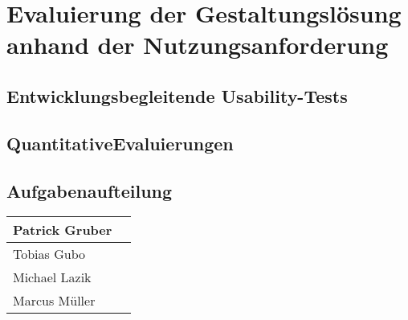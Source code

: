 \documentclass[12pt, a4paper]{scrartcl}
\begin{document}
	\newpage
	
	\section{Evaluierung der Gestaltungslösung anhand der Nutzungsanforderung}
	\blindtext[2]
	\subsection{Entwicklungsbegleitende Usability-Tests}
	\blindtext[1]
	\subsection{QuantitativeEvaluierungen}
	\blindtext[1]
	
	\subsection*{Aufgabenaufteilung}
	\begin{tabularx}{0.95\textwidth}{|l|X|}
		\hline
		Patrick Gruber & \\
		\hline
		Tobias Gubo & \\
		\hline
		Michael Lazik & \\
		\hline
		Marcus Müller & \\
		\hline
	\end{tabularx}
	
	
	
\end{document}
